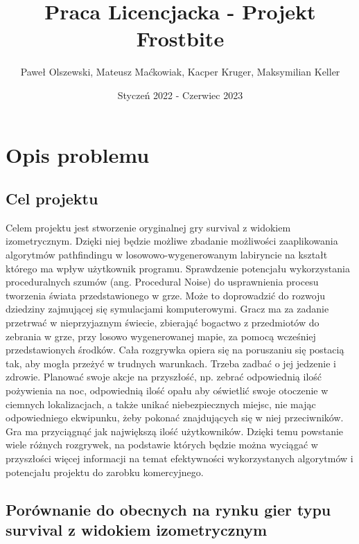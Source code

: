 \documentclass{article}
\title{Praca Licencjacka - Projekt Frostbite}
\author{Paweł Olszewski, Mateusz Maćkowiak, Kacper Kruger, Maksymilian Keller}
\date{Styczeń 2022 - Czerwiec 2023}
\begin{document}
\maketitle
\tableofcontents
\newpage
\section{Opis problemu}
\subsection{Cel projektu}
Celem projektu jest stworzenie oryginalnej gry survival z widokiem izometrycznym. Dzięki niej będzie możliwe zbadanie możliwości zaaplikowania algorytmów pathfindingu w losowowo-wygenerowanym labiryncie na kształt którego ma wpływ użytkownik programu. Sprawdzenie potencjału wykorzystania proceduralnych szumów (ang. Procedural Noise) do usprawnienia procesu tworzenia świata przedstawionego w grze. Może to doprowadzić do rozwoju dziedziny zajmującej się symulacjami komputerowymi. Gracz ma za zadanie przetrwać w nieprzyjaznym świecie, zbierająć bogactwo z przedmiotów do zebrania w grze, przy losowo wygenerowanej mapie, za pomocą wcześniej przedstawionych środków. Cała rozgrywka opiera się na poruszaniu się postacią tak, aby mogła przeżyć w trudnych warunkach. Trzeba zadbać o jej jedzenie i zdrowie. Planować swoje akcje na przyszłość, np. zebrać odpowiednią ilość pożywienia na noc, odpowiednią ilość opału aby oświetlić swoje otoczenie w ciemnych lokalizacjach, a także unikać niebezpiecznych miejsc, nie mając odpowiedniego ekwipunku, żeby pokonać znajdujących się w niej przeciwników. Gra ma przyciągnąć jak największą ilość użytkowników. Dzięki temu powstanie wiele różnych rozgrywek, na podstawie których będzie można wyciągać w przyszłości więcej informacji na temat efektywności wykorzystanych algorytmów i potencjału projektu do zarobku komercyjnego.
\newpage
\subsection{Porównanie do obecnych na rynku gier typu survival z widokiem izometrycznym}
\end{document}
